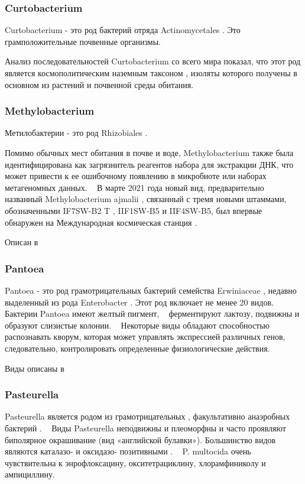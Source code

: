 \documentclass[11pt]{article}
\begin{document}
	\subsubsection{Curtobacterium}
	Curtobacterium - это род бактерий отряда Actinomycetales . Это грамположительные почвенные организмы. ~\cite{Curtobacterium_1}
	
	Анализ последовательностей Curtobacterium со всего мира показал, что этот род является космополитическим наземным таксоном , изоляты которого получены в основном из растений и почвенной среды обитания. ~\cite{Curtobacterium_2}
	
	\subsubsection{Methylobacterium}
	Метилобактерии - это род Rhizobiales . ~\cite{Methylobacterium_2}
	
	Помимо обычных мест обитания в почве и воде, Methylobacterium также была идентифицирована как загрязнитель реагентов набора для экстракции ДНК, что может привести к ее ошибочному появлению в микробиоте или наборах метагеномных данных. ~\cite{Methylobacterium_3} В марте 2021 года новый вид, предварительно названный Methylobacterium ajmalii , связанный с тремя новыми штаммами, обозначенными IF7SW-B2 T , IIF1SW-B5 и IIF4SW-B5, был впервые обнаружен на Международная космическая станция . ~\cite{Methylobacterium_4, Methylobacterium_5}
	
	Описан в ~\cite{Methylobacterium_1,Methylobacterium_2,Methylobacterium_3,Methylobacterium_4,Methylobacterium_5,Methylobacterium_6, Methylobacterium_7, Methylobacterium_8}
	
	\subsubsection{Pantoea}
	Pantoea - это род грамотрицательных бактерий семейства Erwiniaceae , недавно выделенный из рода Enterobacter . Этот род включает не менее 20 видов. ~\cite{Pantoea_1} Бактерии Pantoea имеют желтый пигмент, ~\cite{Pantoea_1} ферментируют лактозу, подвижны и образуют слизистые колонии. ~\cite{Pantoea_2} Некоторые виды обладают способностью распознавать кворум, которая может управлять экспрессией различных генов, следовательно, контролировать определенные физиологические действия. ~\cite{Pantoea_3}
	
	Виды описаны в ~\cite{Pantoea_1, Pantoea_2, Pantoea_3, Pantoea_4, Pantoea_5, Pantoea_6}
	
	\subsubsection{Pasteurella}
	Pasteurella является родом из грамотрицательных , факультативно анаэробных бактерий . ~\cite{Pasteurella_1, Pasteurella_2} Виды Pasteurella неподвижны и плеоморфны и часто проявляют биполярное окрашивание (вид «английской булавки»). Большинство видов являются каталазо- и оксидазо- позитивными . ~\cite{Pasteurella_3}
	P. multocida очень чувствительна к энрофлоксацину, окситетрациклину, хлорамфиниколу и ампициллину. ~\cite{Pasteurella_16}
	
\end{document}
